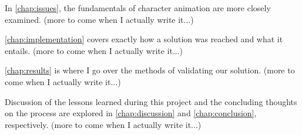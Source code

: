 In \autoref{chap:issues}, the fundamentals of character animation are more closely examined. (more to come when I actually write it...)

\autoref{chap:implementation} covers exactly how a solution was reached and what it entails. (more to come when I actually write it...)

\autoref{chap:results} is where I go over the methods of validating our solution. (more to come when I actually write it...)

Discussion of the lessons learned during this project and the concluding thoughts on the process are explored in \autoref{chap:discussion} and \autoref{chap:conclusion}, respectively. (more to come when I actually write it...)

